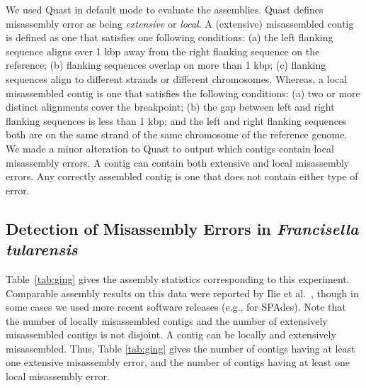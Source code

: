 We used Quast \cite{quast} in default mode to evaluate the assemblies.  
Quast defines misassembly error as being {\em extensive} or {\em local}.  
A (extensive) misassembled contig is defined as one that satisfies one following conditions:  (a) the left flanking sequence aligns over 1 kbp away from the right flanking sequence on the reference; (b) flanking sequences overlap on more than 1 kbp; (c) flanking sequences align to different strands or different chromosomes. 
Whereas, a local misassembled contig is one that satisfies the following conditions: (a) two or more distinct alignments cover the breakpoint; (b) the gap between left and right flanking sequences is less than 1 kbp; and the left and right flanking sequences both are on the same strand of the same chromosome of the reference genome.  
We made a minor alteration to Quast to output which contigs contain local misassembly errors.  
A contig can contain both extensive and local misassembly errors.  
Any correctly assembled contig is one that does not contain either type of error.  

\subsection{Detection of Misassembly Errors in {\em Francisella tularensis}} \label{sec:tularensis}

Table~\ref{tab:ging} gives the assembly statistics corresponding to this experiment.  
Comparable assembly results on this data were reported by Ilie et al.~\cite{sage}, though in some cases we used more recent software releases (e.g., for SPAdes).  
Note that the number of locally misassembled contigs and the number of extensively misassembled contigs is not disjoint.
A contig can be locally and extensively misassembled.   
Thus, Table \ref{tab:ging} gives the number of contigs having at least one extensive misassembly error, and the number of contigs having at least one local misassembly error.

